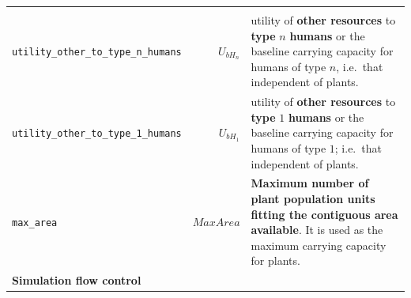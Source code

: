 \documentclass[
]{book}
\begin{document}
\begin{longtable}[]{@{}lrl@{}}
\begin{minipage}[t]{0.39\columnwidth}
\end{minipage}\tabularnewline
\begin{minipage}[t]{0.27\columnwidth}\raggedright
\texttt{utility\_other\_to\_type\_n\_humans}\strut
\end{minipage} & \begin{minipage}[t]{0.25\columnwidth}\raggedleft
\(U_{bH_{n}}\)\strut
\end{minipage} & \begin{minipage}[t]{0.39\columnwidth}\raggedright
utility of \textbf{other resources} to \textbf{type} \(n\) \textbf{humans} or the baseline carrying capacity for humans of type \(n\), i.e.~that independent of plants.\strut
\end{minipage}\tabularnewline
\begin{minipage}[t]{0.27\columnwidth}\raggedright
\texttt{utility\_other\_to\_type\_1\_humans}\strut
\end{minipage} & \begin{minipage}[t]{0.25\columnwidth}\raggedleft
\(U_{bH_{1}}\)\strut
\end{minipage} & \begin{minipage}[t]{0.39\columnwidth}\raggedright
utility of \textbf{other resources} to \textbf{type} \(1\) \textbf{humans} or the baseline carrying capacity for humans of type \(1\); i.e.~that independent of plants.\strut
\end{minipage}\tabularnewline
\begin{minipage}[t]{0.27\columnwidth}\raggedright
\texttt{max\_area}\strut
\end{minipage} & \begin{minipage}[t]{0.25\columnwidth}\raggedleft
\(MaxArea\)\strut
\end{minipage} & \begin{minipage}[t]{0.39\columnwidth}\raggedright
\textbf{Maximum number of plant population units fitting the contiguous area available}. It is used as the maximum carrying capacity for plants.\strut
\end{minipage}\tabularnewline
\begin{minipage}[t]{0.27\columnwidth}\raggedright
\textbf{Simulation flow control}\strut
\end{minipage} & \begin{minipage}[t]{0.25\columnwidth}\raggedleft
\strut
\end{minipage} & \begin{minipage}[t]{0.39\columnwidth}\raggedright
\strut
\end{minipage}\tabularnewline

\end{longtable}
\end{document}
